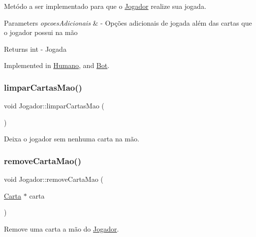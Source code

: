 Metódo a ser implementado para que o \mbox{\hyperlink{class_jogador}{Jogador}} realize sua jogada. 


\begin{DoxyParams}{Parameters}
{\em opcoes\+Adicionais} & -\/ Opções adicionais de jogada além das cartas que o jogador possui na mão \\
\hline
\end{DoxyParams}
\begin{DoxyReturn}{Returns}
int -\/ Jogada 
\end{DoxyReturn}


Implemented in \mbox{\hyperlink{class_humano_aad706f019b99747f9c49d915f678998d}{Humano}}, and \mbox{\hyperlink{class_bot_ab3d1a1563bada68fef705b2ca0af6386}{Bot}}.

\mbox{\label{class_jogador_ae9be28c426f205bb1496d38324befc62}} 
\subsubsection{\texorpdfstring{limparCartasMao()}{limparCartasMao()}}
{\footnotesize\ttfamily void Jogador\+::limpar\+Cartas\+Mao (\begin{DoxyParamCaption}{ }\end{DoxyParamCaption})}



Deixa o jogador sem nenhuma carta na mão. 

\mbox{\label{class_jogador_ab835948a3cc9f4876e8d5a417b8c4d2f}} 
\subsubsection{\texorpdfstring{removeCartaMao()}{removeCartaMao()}\hspace{0.1cm}{\footnotesize\ttfamily [1/2]}}
{\footnotesize\ttfamily void Jogador\+::remove\+Carta\+Mao (\begin{DoxyParamCaption}\item[{\mbox{\hyperlink{class_carta}{Carta}} $\ast$}]{carta }\end{DoxyParamCaption})}



Remove uma carta a mão do \mbox{\hyperlink{class_jogador}{Jogador}}. 



